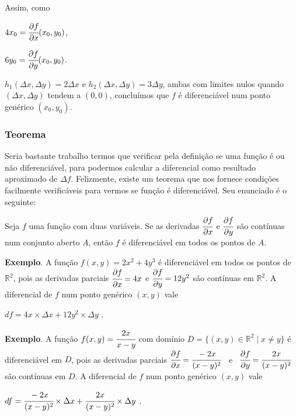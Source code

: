 		Assim, como

		\medskip

		$4x_{0} = \cfrac{\partial f}{\partial x} (x_{0}, y_{0})$,

		$6y_{0} = \cfrac{\partial f}{\partial y} (x_{0}, y_{0})$.

		\medskip

		$h_{1}(\Delta x, \Delta y) = 2\Delta x$ e $h_{2}(\Delta x, \Delta y) = 3\Delta y$, ambas com limites nulos quando $(\Delta x, \Delta y)$ tendem a $(0, 0)$, concluímos que $f$ é diferenciável num ponto genérico $(x_{0}, y_{0})$.

		\subsubsection{Teorema \cite{morettin}}

			Seria bastante trabalho termos que verificar pela definição se uma função é ou não diferenciável, para podermos calcular a diferencial como resultado aproximado de $\Delta f$. Felizmente, existe um teorema que nos fornece condições facilmente verificáveis para vermos se função é diferenciável. Seu enunciado é o seguinte:

			Seja $f$ uma função com duas variáveis. Se as derivadas $\cfrac{\partial f}{\partial x}$ e $\cfrac{\partial f}{\partial y}$ são contínuas num conjunto aberto $A$, então $f$ é diferenciável em todos os pontos de $A$.

			\bigskip

			\textbf{Exemplo}. A função $f(x, y) = 2x^{2} + 4y^{3}$ é diferenciável em todos os pontos de $\mathbb{R}^{2}$, pois as derivadas parciais $\cfrac{\partial f}{\partial x} = 4x$ e $\cfrac{\partial f}{\partial y} = 12y^{2}$ são contínuas em $\mathbb{R}^{2}$. A diferencial de $f$ num ponto genérico $(x, y)$ vale

			\bigskip

			$df = 4x \times \Delta x + 12y^{2} \times \Delta y$ .

			\medskip

			\textbf{Exemplo}. A função $f(x, y) = \cfrac{2x}{x - y}$ com domínio $D = \{(x, y) \in \mathbb{R}^{2} \mid x \neq y\}$ é diferenciável em $D$, pois as derivadas parciais $\cfrac{\partial f}{\partial x} = \cfrac{-2x}{(x - y)^{2}}$ \ e \ $\cfrac{\partial f}{\partial y} = \cfrac{2x}{(x - y)^{2}}$ são contínuas em $D$. A diferencial de $f$ num ponto genérico $(x, y)$ vale

			\medskip

			$df = \cfrac{-2x}{(x - y)^{2}} \times \Delta x +  \cfrac{2x}{(x - y)^{2}} \times \Delta y$ .


